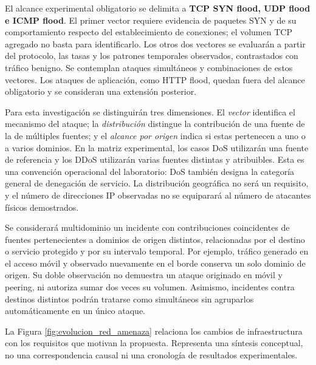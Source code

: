 El alcance experimental obligatorio se delimita a \textbf{TCP SYN flood, UDP flood e ICMP flood}. El primer vector requiere evidencia de paquetes SYN y de su comportamiento respecto del establecimiento de conexiones; el volumen TCP agregado no basta para identificarlo. Los otros dos vectores se evaluarán a partir del protocolo, las tasas y los patrones temporales observados, contrastados con tráfico benigno. Se contemplan ataques simultáneos y combinaciones de estos vectores. Los ataques de aplicación, como HTTP flood, quedan fuera del alcance obligatorio y se consideran una extensión posterior.

Para esta investigación se distinguirán tres dimensiones. El \textit{vector} identifica el mecanismo del ataque; la \textit{distribución} distingue la contribución de una fuente de la de múltiples fuentes; y el \textit{alcance por origen} indica si estas pertenecen a uno o a varios dominios. En la matriz experimental, los casos DoS utilizarán una fuente de referencia y los DDoS utilizarán varias fuentes distintas y atribuibles. Esta es una convención operacional del laboratorio: DoS también designa la categoría general de denegación de servicio. La distribución geográfica no será un requisito, y el número de direcciones IP observadas no se equiparará al número de atacantes físicos demostrados.

Se considerará multidominio un incidente con contribuciones coincidentes de fuentes pertenecientes a dominios de origen distintos, relacionadas por el destino o servicio protegido y por su intervalo temporal. Por ejemplo, tráfico generado en el acceso móvil y observado nuevamente en el borde conserva un solo dominio de origen. Su doble observación no demuestra un ataque originado en móvil y peering, ni autoriza sumar dos veces su volumen. Asimismo, incidentes contra destinos distintos podrán tratarse como simultáneos sin agruparlos automáticamente en un único ataque.

La Figura \ref{fig:evolucion_red_amenaza} relaciona los cambios de infraestructura con los requisitos que motivan la propuesta. Representa una síntesis conceptual, no una correspondencia causal ni una cronología de resultados experimentales.

